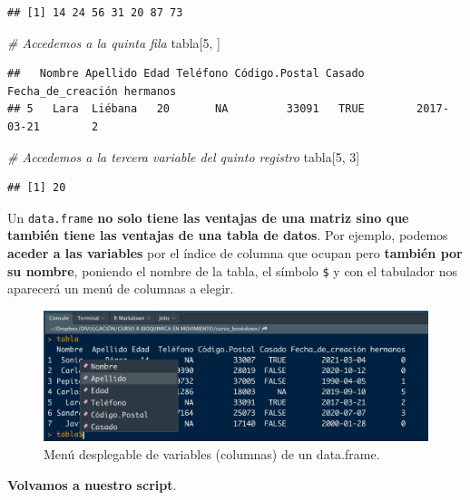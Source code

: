 \documentclass[11pt,]{book}
\newenvironment{Shaded}{\begin{snugshade}}{\end{snugshade}}
\newcommand{\CommentTok}[1]{\textcolor[rgb]{0.37,0.37,0.37}{\textit{#1}}}
\newcommand{\DecValTok}[1]{\textcolor[rgb]{0.06,0.06,0.06}{#1}}
\newcommand{\NormalTok}[1]{#1}
\begin{document}
\begin{verbatim}
## [1] 14 24 56 31 20 87 73
\end{verbatim}

\begin{Shaded}
\begin{Highlighting}[]
\CommentTok{# Accedemos a la quinta fila}
\NormalTok{tabla[}\DecValTok{5}\NormalTok{, ]}
\end{Highlighting}
\end{Shaded}

\begin{verbatim}
##   Nombre Apellido Edad Teléfono Código.Postal Casado Fecha_de_creación hermanos
## 5   Lara  Liébana   20       NA         33091   TRUE        2017-03-21        2
\end{verbatim}

\begin{Shaded}
\begin{Highlighting}[]
\CommentTok{# Accedemos a la tercera variable del quinto registro}
\NormalTok{tabla[}\DecValTok{5}\NormalTok{, }\DecValTok{3}\NormalTok{]}
\end{Highlighting}
\end{Shaded}

\begin{verbatim}
## [1] 20
\end{verbatim}

Un \texttt{data.frame} \textbf{no solo tiene las ventajas de una matriz sino que también tiene las ventajas de una tabla de datos}. Por ejemplo, podemos \textbf{aceder a las variables} por el índice de columna que ocupan pero \textbf{también por su nombre}, poniendo el nombre de la tabla, el símbolo \texttt{\$} y con el tabulador nos aparecerá un menú de columnas a elegir.

\begin{figure}

{\centering \includegraphics[width=0.5\linewidth]{./img/tabla_dolar} 

}

\caption{Menú desplegable de variables (columnas) de un data.frame.}\label{fig:tabla-dolar}
\end{figure}

\textbf{Volvamos a nuestro script}.
\end{document}
